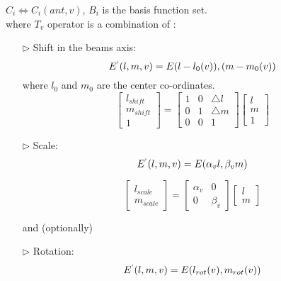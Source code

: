 \documentclass[12pt, a4paper]{article}%
\theoremstyle{plain}
\begin{document}
$C_i \Leftrightarrow C_i(ant,v)$, $B_i$ is the basis function set.
\\where $T_v$ operator is a combination of :
\begin{enumerate}%
\item [$\rhd$]Shift in the beams axis: \begin{equation}
E^`(l, m, v) =  E(l - l_0(v)), (m - m_0(v))
\end{equation} 	
where $l_0$ and $m_0$ are the center co-ordinates.
\begin{equation}
\left[\begin{array}{ccc}
l_{shift} \\ m_{shift} \\ 1
\end{array}\right]
=
\left[\begin{array}{ccc}
1 & 0 & {\triangle}l\\0 & 1 & {\triangle}m\\0 & 0 & 1
\end{array}\right]
\left[\begin{array}{ccc}
l \\ m\\1
\end{array}\right]
\end{equation}

\item[$\rhd$]  Scale: 
\begin{equation}
E^`(l, m, v) =  E(\alpha_v l,\beta_v m)
\end{equation}

\begin{equation}
\left[\begin{array}{cc}
l_{scale} \\ m_{scale}
\end{array}\right]
=
\left[\begin{array}{cc}
\alpha_v & 0 \\0 & \beta_v
\end{array}\right]
\left[\begin{array}{cc}
l \\  m
\end{array}\right]
\end{equation} 

and  (optionally)
\item[$\rhd$] Rotation:
\begin{equation}
E^`(l, m, v) =  E(l_{rot}(v),m_{rot}(v))
\end{equation}


\end{enumerate}
\end{document}
